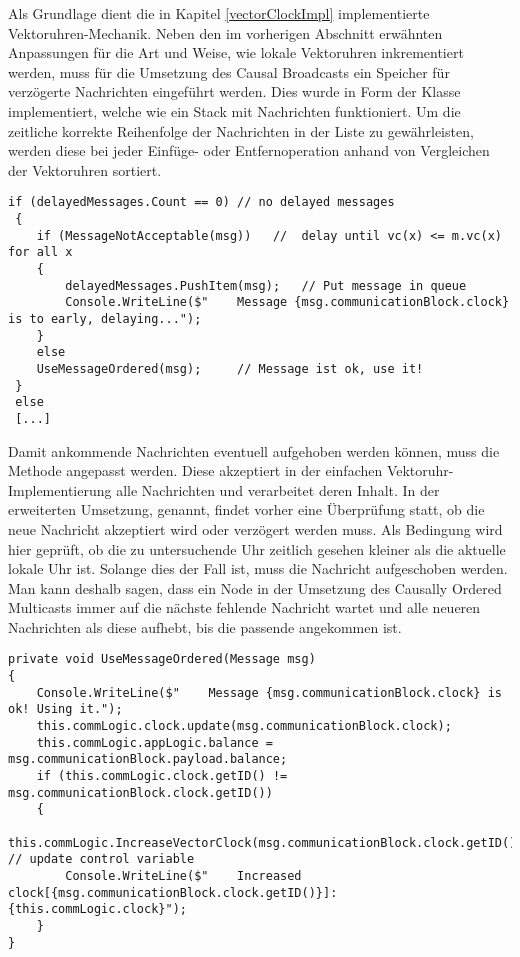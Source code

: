 Als Grundlage dient die in Kapitel \ref{vectorClockImpl} implementierte Vektoruhren-Mechanik. Neben den im vorherigen Abschnitt erwähnten Anpassungen für die Art und Weise, wie lokale Vektoruhren inkrementiert werden, muss für die Umsetzung des Causal Broadcasts ein Speicher für verzögerte Nachrichten eingeführt werden. Dies wurde in Form der Klasse  implementiert, welche wie ein Stack mit Nachrichten funktioniert. Um die zeitliche korrekte Reihenfolge der Nachrichten in der Liste zu gewährleisten, werden diese bei jeder Einfüge- oder Entfernoperation anhand von Vergleichen der Vektoruhren sortiert. 

\begin{lstlisting}[label=lst:delayMessage,
language=sharpc,
float=ht,
firstnumber=1,
caption={Auszug aus der Methode \code{HandleCommunicationMessageOrdered()}. Hier wird geprüft, ob schon aufgeschobenen Nachrichten vorhanden sind und ob die angekommende akzeptiert werden kann.}]
 if (delayedMessages.Count == 0) // no delayed messages
 {
 	if (MessageNotAcceptable(msg))   //  delay until vc(x) <= m.vc(x) for all x
 	{
 		delayedMessages.PushItem(msg);   // Put message in queue
 		Console.WriteLine($"    Message {msg.communicationBlock.clock} is to early, delaying...");
 	}
 	else
 	UseMessageOrdered(msg);     // Message ist ok, use it!
 }
 else
 [...]
\end{lstlisting}

Damit ankommende Nachrichten eventuell aufgehoben werden können, muss die Methode  angepasst werden. Diese akzeptiert in der einfachen Vektoruhr-Implementierung alle Nachrichten und verarbeitet deren Inhalt. In der erweiterten Umsetzung,  genannt, findet vorher eine Überprüfung statt, ob die neue Nachricht akzeptiert wird oder verzögert werden muss. Als Bedingung wird hier geprüft, ob die zu untersuchende Uhr zeitlich gesehen kleiner als die aktuelle lokale Uhr ist. Solange dies der Fall ist, muss die Nachricht aufgeschoben werden. Man kann deshalb sagen, dass ein Node in der Umsetzung des Causally Ordered Multicasts immer auf die nächste fehlende Nachricht wartet und alle neueren Nachrichten als diese aufhebt, bis die passende angekommen ist.

\begin{lstlisting}[label=lst:useMessage,
language=sharpc,
float=ht,
firstnumber=1,
caption={Verarbeitung einer akzeptierten Nachricht.}]
private void UseMessageOrdered(Message msg)
{
	Console.WriteLine($"    Message {msg.communicationBlock.clock} is ok! Using it.");
	this.commLogic.clock.update(msg.communicationBlock.clock);
	this.commLogic.appLogic.balance = msg.communicationBlock.payload.balance;
	if (this.commLogic.clock.getID() != msg.communicationBlock.clock.getID())
	{
		this.commLogic.IncreaseVectorClock(msg.communicationBlock.clock.getID());           // update control variable
		Console.WriteLine($"    Increased clock[{msg.communicationBlock.clock.getID()}]: {this.commLogic.clock}");
	}
}


\end{lstlisting}


